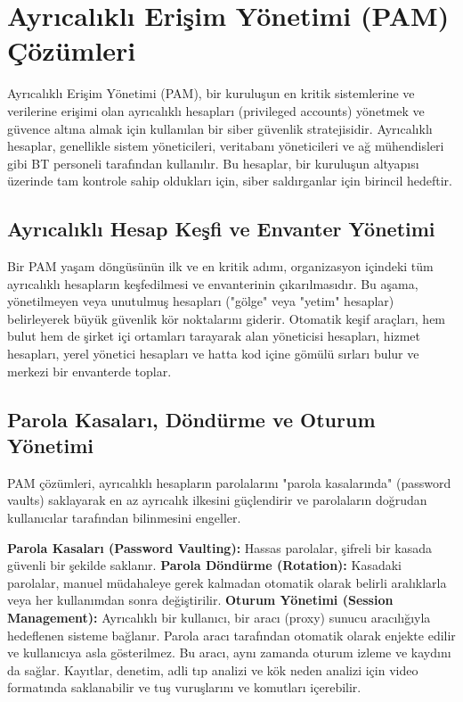 \section{Ayrıcalıklı Erişim Yönetimi (PAM) Çözümleri}
Ayrıcalıklı Erişim Yönetimi (PAM), bir kuruluşun en kritik sistemlerine ve verilerine erişimi olan ayrıcalıklı hesapları (privileged accounts) yönetmek ve güvence altına almak için kullanılan bir siber güvenlik stratejisidir. Ayrıcalıklı hesaplar, genellikle sistem yöneticileri, veritabanı yöneticileri ve ağ mühendisleri gibi BT personeli tarafından kullanılır. Bu hesaplar, bir kuruluşun altyapısı üzerinde tam kontrole sahip oldukları için, siber saldırganlar için birincil hedeftir.

\subsection{Ayrıcalıklı Hesap Keşfi ve Envanter Yönetimi}

Bir PAM yaşam döngüsünün ilk ve en kritik adımı, organizasyon içindeki tüm ayrıcalıklı hesapların keşfedilmesi ve envanterinin çıkarılmasıdır. Bu aşama, yönetilmeyen veya unutulmuş hesapları ("gölge" veya "yetim" hesaplar) belirleyerek büyük güvenlik kör noktalarını giderir. Otomatik keşif araçları, hem bulut hem de şirket içi ortamları tarayarak alan yöneticisi hesapları, hizmet hesapları, yerel yönetici hesapları ve hatta kod içine gömülü sırları bulur ve merkezi bir envanterde toplar.

\subsection{Parola Kasaları, Döndürme ve Oturum Yönetimi}

PAM çözümleri, ayrıcalıklı hesapların parolalarını "parola kasalarında" (password vaults) saklayarak en az ayrıcalık ilkesini güçlendirir ve parolaların doğrudan kullanıcılar tarafından bilinmesini engeller.

\textbf{Parola Kasaları (Password Vaulting):} Hassas parolalar, şifreli bir kasada güvenli bir şekilde saklanır.
\textbf{Parola Döndürme (Rotation):} Kasadaki parolalar, manuel müdahaleye gerek kalmadan otomatik olarak belirli aralıklarla veya her kullanımdan sonra değiştirilir.
\textbf{Oturum Yönetimi (Session Management):} Ayrıcalıklı bir kullanıcı, bir aracı (proxy) sunucu aracılığıyla hedeflenen sisteme bağlanır. Parola aracı tarafından otomatik olarak enjekte edilir ve kullanıcıya asla gösterilmez. Bu aracı, aynı zamanda oturum izleme ve kaydını da sağlar. Kayıtlar, denetim, adli tıp analizi ve kök neden analizi için video formatında saklanabilir ve tuş vuruşlarını ve komutları içerebilir.

